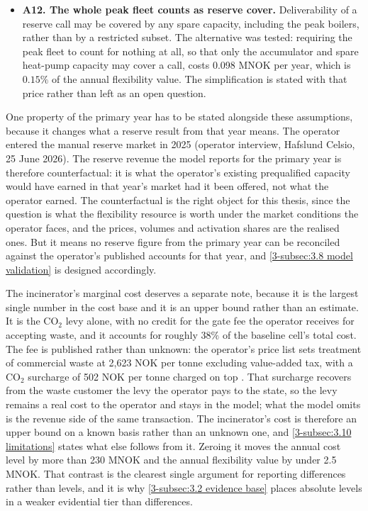 \begin{itemize}
    \item \textbf{A12. The whole peak fleet counts as reserve cover.} Deliverability of a reserve call may be covered by any spare capacity, including the peak boilers, rather than by a restricted subset. The alternative was tested: requiring the peak fleet to count for nothing at all, so that only the accumulator and spare heat-pump capacity may cover a call, costs 0.098 MNOK per year, which is $0.15\%$ of the annual flexibility value. The simplification is stated with that price rather than left as an open question.
\end{itemize}

One property of the primary year has to be stated alongside these assumptions, because it changes what a reserve result from that year means. The operator entered the manual reserve market in 2025 (operator interview, Hafslund Celsio, 25 June 2026). The reserve revenue the model reports for the primary year is therefore counterfactual: it is what the operator's existing prequalified capacity would have earned in that year's market had it been offered, not what the operator earned. The counterfactual is the right object for this thesis, since the question is what the flexibility resource is worth under the market conditions the operator faces, and the prices, volumes and activation shares are the realised ones. But it means no reserve figure from the primary year can be reconciled against the operator's published accounts for that year, and \autoref{3-subsec:3.8 model validation} is designed accordingly.

The incinerator's marginal cost deserves a separate note, because it is the largest single number in the cost base and it is an upper bound rather than an estimate. It is the CO$_2$ levy alone, with no credit for the gate fee the operator receives for accepting waste, and it accounts for roughly $38\%$ of the baseline cell's total cost. The fee is published rather than unknown: the operator's price list sets treatment of commercial waste at 2{,}623 NOK per tonne excluding value-added tax, with a CO$_2$ surcharge of 502 NOK per tonne charged on top \cite{hafslund_priser_2024}. That surcharge recovers from the waste customer the levy the operator pays to the state, so the levy remains a real cost to the operator and stays in the model; what the model omits is the revenue side of the same transaction. The incinerator's cost is therefore an upper bound on a known basis rather than an unknown one, and \autoref{3-subsec:3.10 limitations} states what else follows from it. Zeroing it moves the annual cost level by more than 230 MNOK and the annual flexibility value by under 2.5 MNOK. That contrast is the clearest single argument for reporting differences rather than levels, and it is why \autoref{3-subsec:3.2 evidence base} places absolute levels in a weaker evidential tier than differences.

